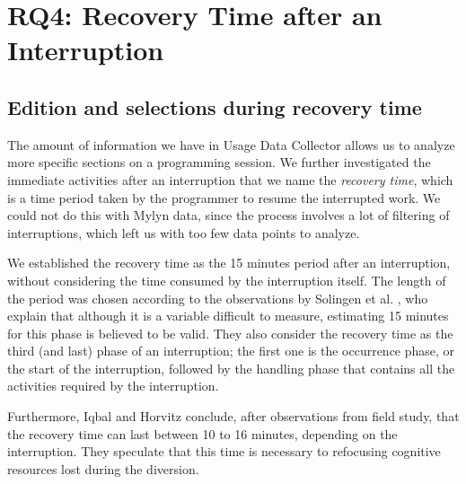 \documentclass[times]{smrauth}
\newcommand\RR[1]{\textbf{Romain #1}}
\begin{document}
%
%

\section{RQ4: Recovery Time after an Interruption}
\subsection{Edition and selections during recovery time}
The amount of information we have in Usage Data Collector allows us to analyze more specific sections on a programming session. We further investigated the immediate activities after an interruption that we name the \textit{recovery time}, which is a time period taken by the programmer to resume the interrupted work. We could not do this with Mylyn data, since the process involves a lot of filtering of interruptions, which left us with too few data points to analyze.

We established the recovery time as the 15 minutes period after an interruption, without considering the time consumed by the interruption itself. The length of the period was chosen according to the observations by Solingen et al. \cite{SBV98}, who explain that although it is a variable difficult to measure, estimating 15 minutes for this phase is believed to be valid. They also consider the recovery time as the third (and last) phase of an interruption; the first one is the occurrence phase, or the start of the interruption, followed by the handling phase that contains all the activities required by the interruption.

Furthermore, Iqbal and Horvitz \cite{IH07} conclude, after observations from field study, that the recovery time can last between 10 to 16 minutes, depending on the interruption. They speculate that this time is necessary to refocusing cognitive resources lost during the diversion.
\end{document}
